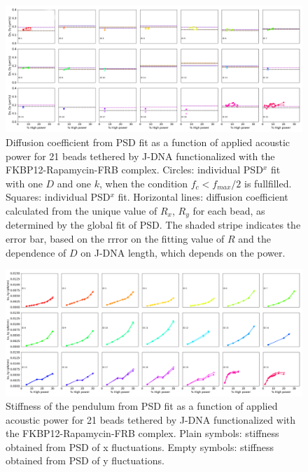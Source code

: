 \documentclass{biophys-new}
\begin{document}
\begin{figure}
	\centering
	\centerline {\includegraphics[width=1\linewidth]{Figures/Power_Friction_Bis_RapaRemoveLegend.png}}
	\caption{%
		Diffusion coefficient from PSD fit as a function of applied acoustic power for 21 beads tethered by J-DNA functionalized with the FKBP12-Rapamycin-FRB complex. Circles: individual PSD$^x$ fit with one $D$ and one $k$, when the condition $f_c < f_{max}/2$ is fullfilled. Squares: individual PSD$^x$ fit. Horizontal lines: diffusion coefficient calculated from the unique value of $R_x$, $R_y$ for each bead, as determined by the global fit of PSD. The shaded stripe indicates the error bar, based on the rrror on the fitting value of $R$ and the dependence of $D$ on J-DNA length, which depends on the power.}
	\label{fig:PowerDiffusion}
\end{figure}

\begin{figure}
	\centering
	\centerline {\includegraphics[width=1\linewidth]{Figures/Power_Stiffness_Ter_Rapa.png}}
	\caption{Stiffness of the pendulum from PSD fit as a function of applied acoustic power for 21 beads tethered by J-DNA functionalized with the FKBP12-Rapamycin-FRB complex. Plain symbols: stiffness obtained from PSD of x fluctuations. Empty symbols: stiffness obtained from PSD of y fluctuations.}
	\label{fig:PowerStiffness}	
\end{figure}
\end{document}
